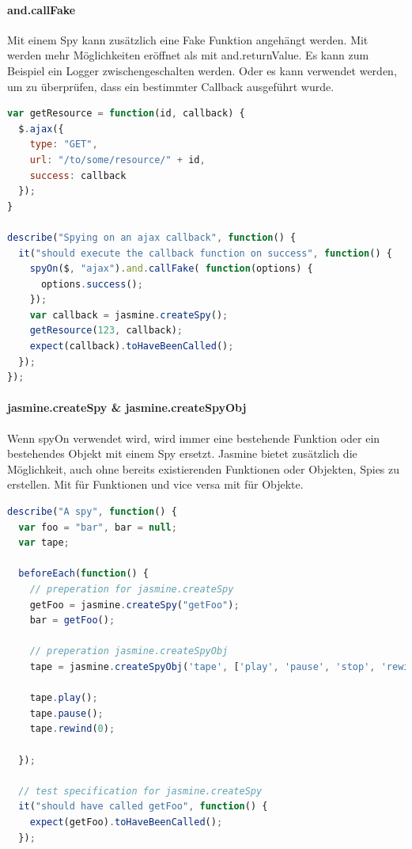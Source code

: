 {\paragraph{and.callFake}
Mit einem Spy kann zusätzlich eine Fake Funktion angehängt werden. Mit  werden mehr Möglichkeiten eröffnet als mit and.returnValue. Es kann zum Beispiel ein Logger zwischengeschalten werden. Oder es kann verwendet werden, um zu überprüfen, dass ein bestimmter Callback ausgeführt wurde.

\begin{lstlisting}[language=JavaScript]
var getResource = function(id, callback) {
  $.ajax({
    type: "GET",
    url: "/to/some/resource/" + id,
    success: callback
  });
}

describe("Spying on an ajax callback", function() {
  it("should execute the callback function on success", function() {
    spyOn($, "ajax").and.callFake( function(options) {
      options.success();
    });
    var callback = jasmine.createSpy();
    getResource(123, callback);
    expect(callback).toHaveBeenCalled();
  });
});
\end{lstlisting}

\paragraph{jasmine.createSpy \& jasmine.createSpyObj}
Wenn spyOn verwendet wird, wird immer eine bestehende Funktion oder ein bestehendes Objekt mit einem Spy ersetzt. Jasmine bietet zusätzlich die Möglichkeit, auch ohne bereits existierenden Funktionen oder Objekten, Spies zu erstellen. Mit  für Funktionen und vice versa mit  für Objekte.

\begin{lstlisting}[language=JavaScript]
describe("A spy", function() {
  var foo = "bar", bar = null;
  var tape;

  beforeEach(function() {
    // preperation for jasmine.createSpy
    getFoo = jasmine.createSpy("getFoo");
    bar = getFoo();

    // preperation jasmine.createSpyObj
    tape = jasmine.createSpyObj('tape', ['play', 'pause', 'stop', 'rewind']);

    tape.play();
    tape.pause();
    tape.rewind(0);

  });

  // test specification for jasmine.createSpy
  it("should have called getFoo", function() {
    expect(getFoo).toHaveBeenCalled();
  });


\end{lstlisting}}
